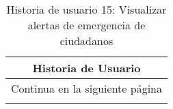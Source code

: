 

\begin{longtable}{|p{6.7cm}|p{6.7cm}|}
    \caption{Historia de usuario 15: Visualizar alertas de emergencia de ciudadanos} \label{tab:historia-15}
    \\
    \hline
    \multicolumn{2}{|c|}{\textbf{Historia de Usuario}}                                                                                                                                                                    \\
    \hline

    \endfirsthead

    \hline
    \endhead

    \hline
    \multicolumn{2}{|c|}{{Continua en la siguiente página}}                                                                                                                                                               \\
    \hline
    \endfoot

    \hline
    \endlastfoot


\end{longtable}
